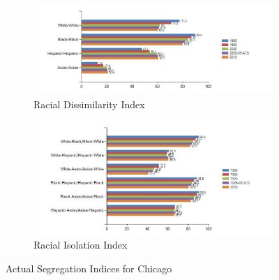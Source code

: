 \documentclass[11pt]{asaproc}
\newcommand{\1}{\mathbb{1}}
\begin{document}
\begin{figure}[!h]
\centering
\begin{subfigure}[b]{.5\textwidth}
  \centering
\includegraphics[scale=.35]{figures/chart1.png}
\caption{Racial Dissimilarity Index}
\end{subfigure}%
\begin{subfigure}[b]{.5\textwidth}
  \centering
\includegraphics[scale=.35]{figures/chart2.png}
\caption{Racial Isolation Index}
\end{subfigure}
\caption{Actual Segregation Indices for Chicago}
\end{figure}
\end{document}
